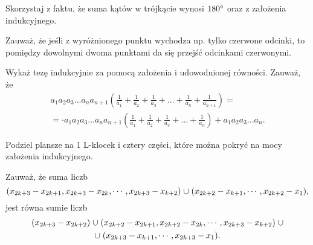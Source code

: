 \newpage
{}


\begin{hints_list}
	\item Skorzystaj z faktu, że suma kątów w trójkącie wynosi $180\degree$ oraz z założenia indukcyjnego.

	\item *

	\item *

	\item Zauważ, że jeśli z wyróżnionego punktu wychodza np. tylko czerwone odcinki, to pomiędzy dowolnymi dwoma punktami da się przejść odcinkami czerwonymi.

	\item Wykaż tezę indukcyjnie za pomocą założenia i udowodnionej równości. Zauważ, że 
	\begin{align*}
		a_1a_2a_3...a_na_{n+1}\left(\frac{1}{a_1} + \frac{1}{a_2} + \frac{1}{a_3} + ... + \frac{1}{a_n} + \frac{1}{a_{n + 1}}\right) = \\ =  \cdot a_1a_2a_3...a_na_{n+1}\left(\frac{1}{a_1} + \frac{1}{a_2} + \frac{1}{a_3} + ... + \frac{1}{a_n}\right) + a_1a_2a_3...a_n.
	\end{align*}

	\item Podziel plansze na 1 L-klocek i cztery części, które można pokryć na mocy założenia indukcyjnego.

	\item Zauważ, że suma liczb
	\[
		({x_{2k+3}-x_{2k+1},x_{2k+3}-x_{2k},\cdots,x_{2k+3}-x_{k+2}}) \thickspace {\cup}\thickspace ({x_{2k+2}-x_{k+1},\cdots,x_{2k+2}-x_1}),
	\]
	jest równa sumie liczb
	\begin{gather*}
		(x_{2k+3} - x_{2k+2}) \thickspace {\cup}\thickspace ({x_{2k+2} - x_{2k+1}, x_{2k+2} - x_{2k}, \cdots, x_{2k+3} - x_{k+2}}) \thickspace {\cup} \\ {\cup} \thickspace({x_{2k+3}-x_{k+1},\cdots,x_{2k+3}-x_1}).
	\end{gather*}
\end{hints_list}